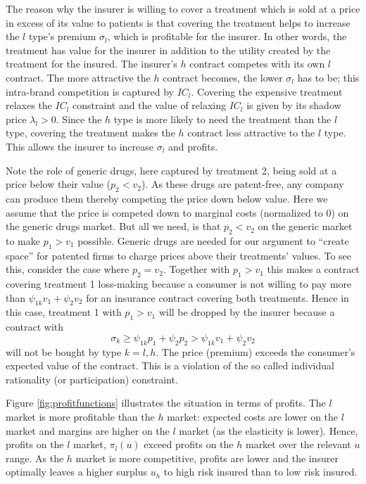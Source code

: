 \documentclass[a4paper,12pt]{article}
\begin{document}
The reason why the insurer is willing to cover a treatment which is sold at a price in excess of its value to patients is that covering the treatment helps to increase the \(l\) type's premium \(\sigma_{l}\), which is profitable for the insurer. In other words, the treatment has value for the insurer in addition to the utility created by the treatment for the insured. The insurer's \(h\) contract competes with its own \(l\) contract. The more attractive the \(h\) contract becomes, the lower \(\sigma_{l}\) has to be; this intra-brand competition is captured by \(IC_{l}\). Covering the expensive treatment relaxes the \(IC_l\) constraint and the value of relaxing \(IC_l\) is given by its shadow price \(\lambda_l > 0\). Since the \(h\) type is more likely to need the treatment than the \(l\) type, covering the treatment makes the \(h\) contract less attractive to the \(l\) type. This allows the insurer to increase \(\sigma_l\) and profits.

Note the role of generic drugs, here captured by treatment 2, being sold at a price below their value (\(p_2 < v_2\)). As these drugs are patent-free, any company can produce them thereby competing the price down below value. Here we assume that the price is competed down to marginal costs (normalized to 0) on the generic drugs market. But all we need, is that \(p_2 < v_2\) on the generic market to make \(p_1>v_1\) possible. Generic drugs are needed for our argument to ``create space'' for patented firms to charge prices above their treatments' values. To see this, consider the case where \(p_2=v_2\). Together with \(p_1>v_1\) this makes a contract covering treatment 1 loss-making because a consumer is not willing to pay more than \(\psi_{1k} v_1 + \psi_{2} v_2\) for an insurance contract covering both treatments. Hence in this case, treatment 1 with \(p_1>v_1\) will be dropped by the insurer because a contract with
\begin{equation}
\label{eq:3}
\sigma_k \geq \psi_{1k} p_1 + \psi_2 p_2 > \psi_{1k} v_1 + \psi_2 v_2
\end{equation}
will not be bought by type \(k=l,h\). The price (premium) exceeds the consumer's expected value of the contract. This is a violation of the so called individual rationality (or participation) constraint.

Figure \ref{fig:profitfunctions} illustrates the situation in terms of profits. The \(l\) market is more profitable than the \(h\) market: expected costs are lower on the \(l\) market and margins are higher on the \(l\) market (as the elasticity is lower). Hence, profits on the \(l\) market, \(\pi_l(u)\) exceed profits on the \(h\) market over the relevant \(u\) range. As the \(h\) market is more competitive, profits are lower and the insurer optimally leaves a higher surplus \(u_h\) to high risk insured than to low risk insured.
\end{document}
